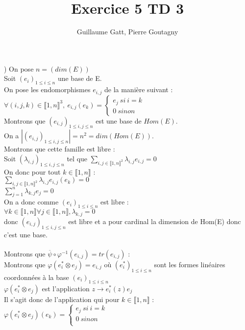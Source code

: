 \documentclass{article}
\begin{document}
\title{Exercice 5 TD 3}
\author{Guillaume Gatt, Pierre Goutagny}
) On pose $n=(dim(E))$ \\
Soit $(e_i)_{ 1\leq i \leq n}$ une base de E. \\
On pose les endomorphismes $e_{i,j}$ de la manière suivant : \\
$\forall (i,j,k) \in \llbracket 1,n\rrbracket^3,\ e_{i,j}(e_k)=\begin{cases}
e_j \ si \ i=k \\
0 \ sinon
\end{cases}$ \\
Montrons que $(e_{i,j})_{ 1\leq i,j \leq n}$ est une base de $Hom(E)$. \\
On a $|(e_{i,j})_{ 1\leq i,j \leq n}|=n^2=dim(Hom(E))$. \\
Montrons que cette famille est libre : \\
Soit $(\lambda_{i,j})_{1 \leq i,j \leq n}$ tel que $\sum_{i,j \in \llbracket 1 , n \rrbracket^2} \lambda_{i,j} e_{i,j} =0$ \\
On donc pour tout $k \in \llbracket1,n\rrbracket$ : \\
$\sum_{i,j \in \llbracket 1 , n \rrbracket^2} \lambda_{i,j} e_{i,j}(e_k) =0$ \\
$\sum_{j=1}^{n} \lambda_{k,j} e_j =0$ \\
On a donc comme $(e_i)_{ 1\leq i \leq n}$ est libre : \\
$\forall k \in \llbracket1,n\rrbracket \forall j \in \llbracket 1,n \rrbracket, \lambda_{k,j}=0$ \\
donc $(e_{i,j})_{ 1\leq i,j \leq n}$ est libre et a pour cardinal la dimension de Hom(E) donc c'est une base. \\ \\
Montrons que $\overline{\psi} \circ \varphi^{-1}(e_{i,j})=tr(e_{i,j})$ : \\
Montrons que $\varphi(e^\ast_i \otimes e_{j})= e_{i,j}$ où $(e^*_i)_{ 1\leq i\leq n}$ sont les formes linéaires coordonnées à la base $(e_i)_{ 1\leq i \leq n}$ \\
$\varphi(e^\ast_i \otimes e_{j})$  est l'application $z \rightarrow e^*_i(z)e_j$ \\
Il s'agit donc de l'application qui pour $k\in \llbracket1,n\rrbracket$ : \\
$\varphi(e^\ast_i \otimes e_{j})(e_k)=\begin{cases}
e_j \ si \ i=k \\
0 \ sinon \\
\end{cases}$ \\
\end{document}
